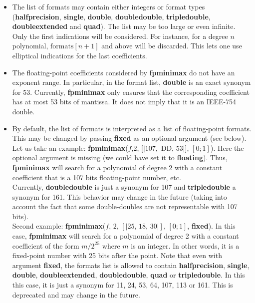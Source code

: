 \begin{itemize}
\item The list of formats may contain either integers or format types
   (\textbf{halfprecision}, \textbf{single}, \textbf{double}, \textbf{doubledouble}, \textbf{tripledouble}, \textbf{doubleextended}
   and \textbf{quad}). The list may be too large or even infinite. Only the first
   indications will be considered. For instance, for a degree $n$ polynomial,
   $\mathrm{formats}[n+1]$ and above will be discarded. This lets one use elliptical
   indications for the last coefficients.

\item The floating-point coefficients considered by \textbf{fpminimax} do not have an
   exponent range. In particular, in the format list, \textbf{double} is an exact synonym
   for 53. Currently, \textbf{fpminimax} only ensures that the corresponding coefficient
   has at most 53 bits of mantissa. It does not imply that it is an
   IEEE-754 double.

\item By default, the list of formats is interpreted as a list of floating-point
   formats. This may be changed by passing \textbf{fixed} as an optional argument (see
   below). Let us take an example: \textbf{fpminimax}($f$,$2$, $[|107,$ DD, $53|]$, $[0;1]$).
   Here the optional argument is missing (we could have set it to \textbf{floating}).
   Thus, \textbf{fpminimax} will search for a polynomial of degree 2 with a constant
   coefficient that is a 107 bits floating-point number, etc.\\
   Currently, \textbf{doubledouble} is just a synonym for 107 and \textbf{tripledouble} a
   synonym for 161. This behavior may change in the future (taking into
   account the fact that some double-doubles are not representable with
   107 bits).\\
   Second example: \textbf{fpminimax}($f$, $2$, $[|25,\,18,\,30|]$, $[0;1]$, \textbf{fixed}).
   In this case, \textbf{fpminimax} will search for a polynomial of degree 2 with a
   constant coefficient of the form $m/2^{25}$ where $m$ is an
   integer. In other words, it is a fixed-point number with 25 bits after
   the point. Note that even with argument \textbf{fixed}, the formats list is
   allowed to contain \textbf{halfprecision}, \textbf{single}, \textbf{double}, \textbf{doubleextended},
   \textbf{doubledouble}, \textbf{quad} or \textbf{tripledouble}. In this this case, it is just
   a synonym for 11, 24, 53, 64, 107, 113 or 161. This is deprecated and
   may change in the future.


\end{itemize}
